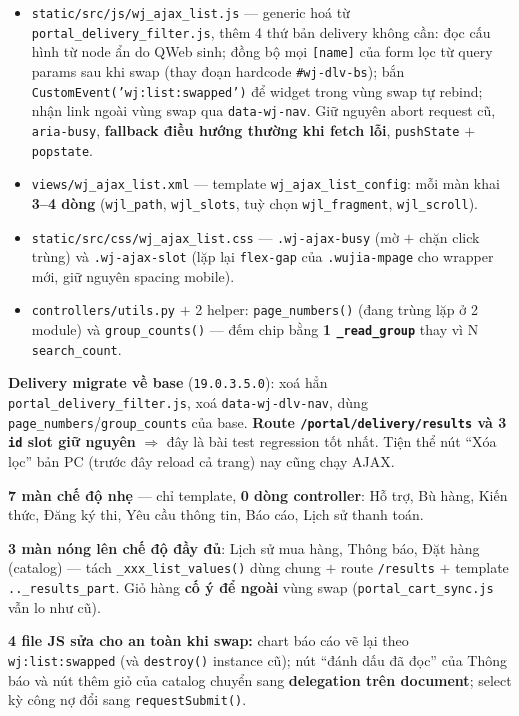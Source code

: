 \begin{itemize}
  \item \texttt{static/src/js/wj\_ajax\_list.js} --- generic hoá từ
    \texttt{portal\_delivery\_filter.js}, thêm 4 thứ bản delivery không cần: đọc cấu hình từ
    node ẩn do QWeb sinh; đồng bộ mọi \texttt{[name]} của form lọc từ query params sau khi swap
    (thay đoạn hardcode \texttt{\#wj-dlv-bs}); bắn
    \texttt{CustomEvent('wj:list:swapped')} để widget trong vùng swap tự rebind; nhận link
    ngoài vùng swap qua \texttt{data-wj-nav}. Giữ nguyên abort request cũ, \texttt{aria-busy},
    \textbf{fallback điều hướng thường khi fetch lỗi}, \texttt{pushState} $+$ \texttt{popstate}.
  \item \texttt{views/wj\_ajax\_list.xml} --- template \texttt{wj\_ajax\_list\_config}: mỗi màn
    khai \textbf{3--4 dòng} (\texttt{wjl\_path}, \texttt{wjl\_slots}, tuỳ chọn
    \texttt{wjl\_fragment}, \texttt{wjl\_scroll}).
  \item \texttt{static/src/css/wj\_ajax\_list.css} --- \texttt{.wj-ajax-busy} (mờ $+$ chặn click
    trùng) và \texttt{.wj-ajax-slot} (lặp lại \texttt{flex-gap} của \texttt{.wujia-mpage} cho
    wrapper mới, giữ nguyên spacing mobile).
  \item \texttt{controllers/utils.py} $+$ 2 helper: \texttt{page\_numbers()} (đang trùng lặp ở 2
    module) và \texttt{group\_counts()} --- đếm chip bằng \textbf{1 \texttt{\_read\_group}} thay
    vì N \texttt{search\_count}.
\end{itemize}

\textbf{Delivery migrate về base} (\texttt{19.0.3.5.0}): xoá hẳn
\texttt{portal\_delivery\_filter.js}, xoá \texttt{data-wj-dlv-nav}, dùng
\texttt{page\_numbers}/\texttt{group\_counts} của base. \textbf{Route \texttt{/portal/delivery/results}
và 3 \texttt{id} slot giữ nguyên} $\Rightarrow$ đây là bài test regression tốt nhất. Tiện thể nút
``Xóa lọc'' bản PC (trước đây reload cả trang) nay cũng chạy AJAX.

\textbf{7 màn chế độ nhẹ} --- chỉ template, \textbf{0 dòng controller}: Hỗ trợ, Bù hàng, Kiến
thức, Đăng ký thi, Yêu cầu thông tin, Báo cáo, Lịch sử thanh toán.

\textbf{3 màn nóng lên chế độ đầy đủ}: Lịch sử mua hàng, Thông báo, Đặt hàng (catalog) ---
tách \texttt{\_xxx\_list\_values()} dùng chung $+$ route \texttt{/results} $+$ template
\texttt{..\_results\_part}. Giỏ hàng \textbf{cố ý để ngoài} vùng swap
(\texttt{portal\_cart\_sync.js} vẫn lo như cũ).

\textbf{4 file JS sửa cho an toàn khi swap:} chart báo cáo vẽ lại theo \texttt{wj:list:swapped}
(và \texttt{destroy()} instance cũ); nút ``đánh dấu đã đọc'' của Thông báo và nút thêm giỏ của
catalog chuyển sang \textbf{delegation trên document}; select kỳ công nợ đổi sang
\texttt{requestSubmit()}.


